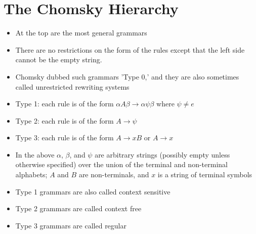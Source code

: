 \documentclass{beamer}
\begin{document}
	\section{The Chomsky Hierarchy}

	\begin{frame}
		\begin{itemize}
			\item At the top are the most general grammars
			\item There are no restrictions on the form of the rules except that the left side cannot be the empty string.
			\item Chomsky dubbed such grammars 'Type 0,' and they are also sometimes called unrestricted rewriting systems
		\end{itemize}
	\end{frame}


	\begin{frame}
		\begin{itemize}
			\item Type 1: each rule is of the form $\alpha A \beta \rightarrow \alpha \psi \beta$ where $\psi \neq e$
			\item Type 2: each rule is of the form $A \rightarrow \psi$
			\item Type 3: each rule is of the form $A \rightarrow x B$ or $A \rightarrow x$
		\end{itemize}
	\end{frame}


	\begin{frame}
		\begin{itemize}
			\item In the above $\alpha$, $\beta$, and $\psi$ are arbitrary strings (possibly empty unless otherwise specified) over the union of the terminal and non-terminal alphabets; $A$ and $B$ are non-terminals, and $x$ is a string of terminal symbols
		\end{itemize}
	\end{frame}


	\begin{frame}
		\begin{itemize}
			\item Type 1 grammars are also called context sensitive
			\item Type 2 grammars are called context free
			\item Type 3 grammars are called regular
		\end{itemize}
	\end{frame}
\end{document}
